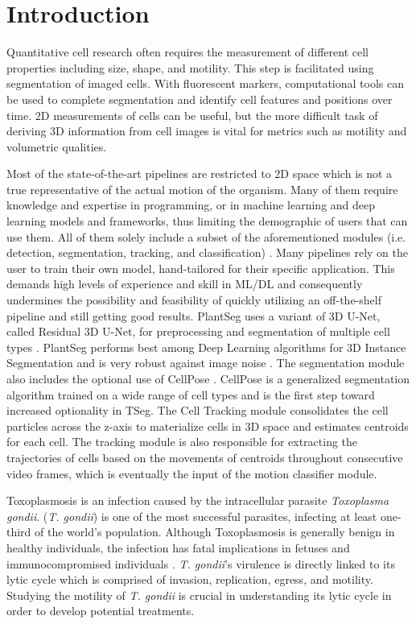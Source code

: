 \documentclass[./dissertation.tex]{subfiles}
\begin{document}
\section{Introduction}
Quantitative cell research often requires the measurement of different cell properties including size, shape, and motility. This step is facilitated using segmentation of imaged cells. With fluorescent markers, computational tools can be used to complete segmentation and identify cell features and positions over time. 2D measurements of cells can be useful, but the more difficult task of deriving 3D information from cell images is vital for metrics such as motility and volumetric qualities.

Most of the state-of-the-art pipelines are restricted to 2D space which is not a true representative of the actual motion of the organism. Many of them require knowledge and expertise in programming, or in machine learning and deep learning models and frameworks, thus limiting the demographic of users that can use them. All of them solely include a subset of the aforementioned modules (i.e. detection, segmentation, tracking, and classification) \cite{stringer2021cellpose}. Many pipelines rely on the user to train their own model, hand-tailored for their specific application. This demands high levels of experience and skill in ML/DL and consequently undermines the possibility and feasibility of quickly utilizing an off-the-shelf pipeline and still getting good results. PlantSeg uses a variant of 3D U-Net, called Residual 3D U-Net, for preprocessing and segmentation of multiple cell types \cite{plantseg}. PlantSeg performs best among Deep Learning algorithms for 3D Instance Segmentation and is very robust against image noise \cite{Kar2021.06.09.447748}. The segmentation module also includes the optional use of CellPose \cite{stringer2021cellpose}. CellPose is a generalized segmentation algorithm trained on a wide range of cell types and is the first step toward increased optionality in TSeg. The Cell Tracking module consolidates the cell particles across the z-axis to materialize cells in 3D space and estimates centroids for each cell. The tracking module is also responsible for extracting the trajectories of cells based on the movements of centroids throughout consecutive video frames, which is eventually the input of the motion classifier module.

Toxoplasmosis is an infection caused by the intracellular parasite \textit{Toxoplasma gondii}. (\textit{T. gondii}) is one of the most successful parasites, infecting at least one-third of the world's population. Although Toxoplasmosis is generally benign in healthy individuals, the infection has fatal implications in fetuses and immunocompromised individuals \cite{saadatnia2012review}. \textit{T. gondii}'s virulence is directly linked to its lytic cycle which is comprised of invasion, replication, egress, and motility. Studying the motility of \textit{T. gondii} is crucial in understanding its lytic cycle in order to develop potential treatments.
\end{document}
